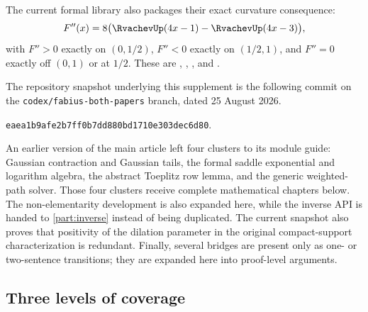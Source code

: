 \documentclass[11pt,oneside]{article}
\theoremstyle{definition}
\theoremstyle{remark}
\begin{document}
The current formal library also packages their exact curvature consequence:
\begin{equation}
 F''(x)=8\bigl(\RvachevUp(4x-1)-\RvachevUp(4x-3)\bigr),
 \label{integration:eq:forward-second-derivative}
\end{equation}
with \(F''>0\) exactly on \((0,1/2)\), \(F''<0\) exactly on \((1/2,1)\), and
\(F''=0\) exactly off \((0,1)\) or at \(1/2\).  These are
, ,
, and
.

The repository snapshot underlying this supplement is the following commit on
the \texttt{codex/fabius-both-papers} branch, dated 25 August 2026.
\begin{center}
 \texttt{eaea1b9afe2b7ff0b7dd880bd1710e303dec6d80}.
\end{center}
An earlier version of the main article left four clusters to its module guide:
Gaussian contraction and Gaussian tails, the formal saddle exponential and
logarithm algebra, the abstract Toeplitz row lemma, and the generic weighted-path solver.
Those four clusters receive complete mathematical chapters below.  The non-elementarity
development is also expanded here, while the inverse API is handed to \cref{part:inverse}
instead of being duplicated.  The current snapshot also proves that positivity of the
dilation parameter in the original compact-support characterization is redundant.  Finally,
several bridges are present only as one- or two-sentence transitions; they are expanded here
into proof-level arguments.

\subsection{Three levels of coverage}
\end{document}
